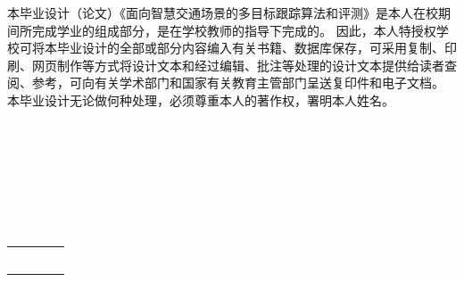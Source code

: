 
\begin{authorizationzh}
	
本毕业设计（论文）《面向智慧交通场景的多目标跟踪算法和评测》是本人在校期间所完成学业的组成部分，是在学校教师的指导下完成的。
因此，本人特授权学校可将本毕业设计的全部或部分内容编入有关书籍、数据库保存，可采用复制、印刷、网页制作等方式将设计文本和经过编辑、批注等处理的设计文本提供给读者查阅、参考，可向有关学术部门和国家有关教育主管部门呈送复印件和电子文档。
本毕业设计无论做何种处理，必须尊重本人的著作权，署明本人姓名。
\\
\\
\\
\\
\\
\\
\\
\\

	
	\vspace{30pt}
	\begin{tabular}{llll}
		\makebox[4em][s]{设计作者（签字）} & \makebox[150pt][c]{  } & \makebox[2em][s]{时间} & \makebox[100pt][c]{\qquad 年\quad 月\quad   日 }\\
		\\ \\ \\
		\makebox[4em][s]{指导教师已阅（签字）} & \makebox[150pt][c]{  } & \makebox[2em][s]{时间} & \makebox[100pt][c]{\qquad 年\quad 月\quad   日 }\\
	\end{tabular}

	
	
\end{authorizationzh}